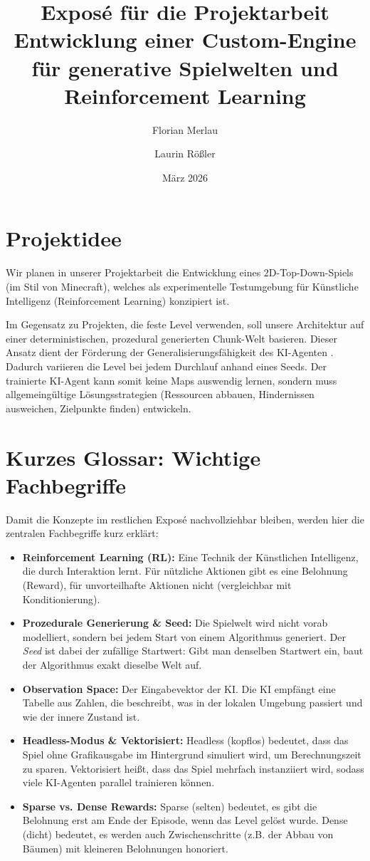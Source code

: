 \documentclass[12pt,a4paper]{article}
\title{\textbf{Expos\'e f\"ur die Projektarbeit} \\ Entwicklung einer Custom-Engine f\"ur generative Spielwelten und Reinforcement Learning}
\author{Florian Merlau \and Laurin Rößler}
\date{M\"arz 2026}
\begin{document}
\maketitle

\section{Projektidee}
Wir planen in unserer Projektarbeit die Entwicklung eines 2D-Top-Down-Spiels (im Stil von Minecraft), welches als experimentelle Testumgebung f\"ur K\"unstliche Intelligenz (Reinforcement Learning) konzipiert ist. 

Im Gegensatz zu Projekten, die feste Level verwenden, soll unsere Architektur auf einer deterministischen, prozedural generierten \glqq Chunk\grqq-Welt basieren. Dieser Ansatz dient der F\"orderung der Generalisierungsf\"ahigkeit des KI-Agenten \cite{cobbe2020procgen, risi2020increasing}. Dadurch variieren die Level bei jedem Durchlauf anhand eines Seeds. Der trainierte KI-Agent kann somit keine Maps auswendig lernen, sondern muss allgemeing\"ultige L\"osungsstrategien (Ressourcen abbauen, Hindernissen ausweichen, Zielpunkte finden) entwickeln.

\section{Kurzes Glossar: Wichtige Fachbegriffe}
Damit die Konzepte im restlichen Expos\'e nachvollziehbar bleiben, werden hier die zentralen Fachbegriffe kurz erkl\"art:
\begin{itemize}
    \item \textbf{Reinforcement Learning (RL):} Eine Technik der K\"unstlichen Intelligenz, die durch Interaktion lernt. F\"ur n\"utzliche Aktionen gibt es eine Belohnung (Reward), f\"ur unvorteilhafte Aktionen nicht (vergleichbar mit Konditionierung).
    \item \textbf{Prozedurale Generierung \& Seed:} Die Spielwelt wird nicht vorab modelliert, sondern bei jedem Start von einem Algorithmus generiert. Der \textit{Seed} ist dabei der zuf\"allige Startwert: Gibt man denselben Startwert ein, baut der Algorithmus exakt dieselbe Welt auf.
    \item \textbf{Observation Space:} Der Eingabevektor der KI. Die KI empf\"angt eine Tabelle aus Zahlen, die beschreibt, was in der lokalen Umgebung passiert und wie der innere Zustand ist.
    \item \textbf{Headless-Modus \& Vektorisiert:} \glqq Headless\grqq{} (kopflos) bedeutet, dass das Spiel ohne Grafikausgabe im Hintergrund simuliert wird, um Berechnungszeit zu sparen. \glqq Vektorisiert\grqq{} hei\ss{}t, dass das Spiel mehrfach instanziiert wird, sodass viele KI-Agenten parallel trainieren k\"onnen.
    \item \textbf{Sparse vs. Dense Rewards:} \glqq Sparse\grqq{} (selten) bedeutet, es gibt die Belohnung erst am Ende der Episode, wenn das Level gel\"ost wurde. \glqq Dense\grqq{} (dicht) bedeutet, es werden auch Zwischenschritte (z.B. der Abbau von B\"aumen) mit kleineren Belohnungen honoriert.
\end{itemize}
\end{document}
